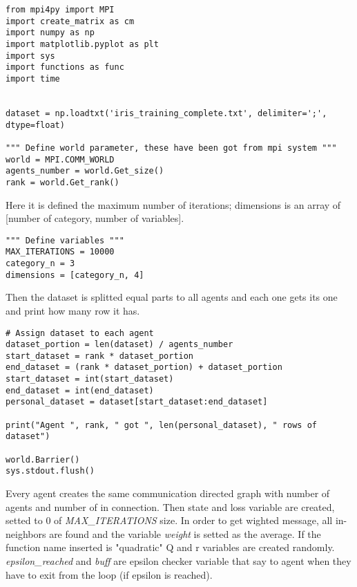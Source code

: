 \documentclass[a4paper,11pt,oneside]{book}
\begin{document}
\begin{lstlisting}
from mpi4py import MPI
import create_matrix as cm
import numpy as np
import matplotlib.pyplot as plt
import sys
import functions as func
import time


dataset = np.loadtxt('iris_training_complete.txt', delimiter=';', dtype=float)

""" Define world parameter, these have been got from mpi system """
world = MPI.COMM_WORLD
agents_number = world.Get_size()
rank = world.Get_rank()
\end{lstlisting}

Here it is defined the maximum number of iterations; dimensions is an array of [number of category, number of variables].

\begin{lstlisting}
""" Define variables """
MAX_ITERATIONS = 10000
category_n = 3
dimensions = [category_n, 4]
\end{lstlisting}

Then the dataset is splitted equal parts to all agents and each one gets its one and print how many row it has.

\begin{lstlisting}
# Assign dataset to each agent
dataset_portion = len(dataset) / agents_number
start_dataset = rank * dataset_portion
end_dataset = (rank * dataset_portion) + dataset_portion
start_dataset = int(start_dataset)
end_dataset = int(end_dataset)
personal_dataset = dataset[start_dataset:end_dataset]

print("Agent ", rank, " got ", len(personal_dataset), " rows of dataset")

world.Barrier()
sys.stdout.flush()
\end{lstlisting}

Every agent creates the same communication directed graph with number of agents and number of in connection. Then state and loss variable are
created, setted to 0 of \textit{MAX\_ITERATIONS} size. In order to get wighted message, all in-neighbors are found and the variable \textit{weight}
is setted as the average. If the function name inserted is "quadratic" Q and r variables are created randomly. \textit{epsilon\_reached} and 
\textit{buff} are epsilon checker variable that say to agent when they have to exit from the loop (if epsilon is reached).
\end{document}
